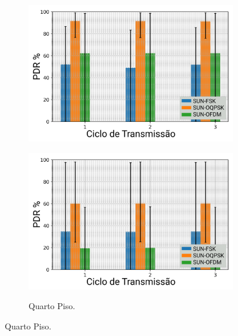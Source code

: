 \begin{figure}[H]
\begin{subfigure}{.4\textwidth}
            \includegraphics[width=\textwidth]{./sections/textual/chapters/images/mod_3_floor.png}
            \label{fig:piso3}
      \end{subfigure}
      \begin{subfigure}{.4\textwidth}
            \centering
            \caption{Quarto Piso.}
            \includegraphics[width=\textwidth]{./sections/textual/chapters/images/mod_4_floor.png}
            \label{fig:piso4}
      \end{subfigure}
      \label{fig:pdr_andar}
\end{figure}




